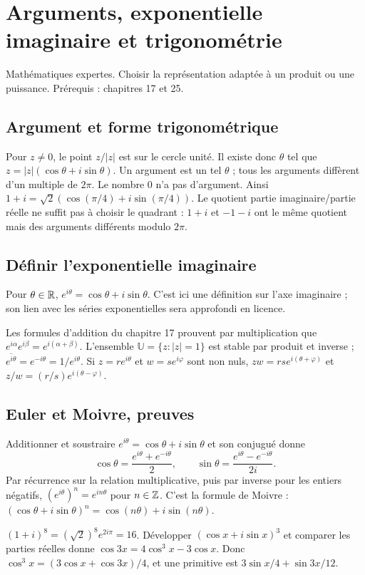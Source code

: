 \documentclass[../cours_tle.tex]{subfiles}
\begin{document}
\setcounter{chapter}{25}
\chapter{Arguments, exponentielle imaginaire et trigonométrie}
\label{ch:26}
\begin{objectif}
Mathématiques expertes. Choisir la représentation adaptée à un produit ou une puissance. Prérequis : chapitres 17 et 25.
\end{objectif}
\section{Argument et forme trigonométrique}
Pour $z\ne0$, le point $z/|z|$ est sur le cercle unité. Il existe donc $\theta$ tel que
$z=|z|(\cos\theta+i\sin\theta)$.
Un argument est un tel $\theta$ ; tous les arguments diffèrent d'un multiple de $2\pi$. Le nombre $0$ n'a pas d'argument.
Ainsi $1+i=\sqrt2(\cos(\pi/4)+i\sin(\pi/4))$.
Le quotient partie imaginaire/partie réelle ne suffit pas à choisir le quadrant : $1+i$ et $-1-i$ ont le même quotient mais des arguments différents modulo $2\pi$.
\section{Définir l'exponentielle imaginaire}
\begin{definition}
Pour $\theta\in\mathbb{R}$, $e^{i\theta}=\cos\theta+i\sin\theta$.
C'est ici une définition sur l'axe imaginaire ; son lien avec les séries exponentielles sera approfondi en licence.
\end{definition}
Les formules d'addition du chapitre 17 prouvent par multiplication que
$e^{i\alpha}e^{i\beta}=e^{i(\alpha+\beta)}$.
L'ensemble $\mathbb U=\{z:|z|=1\}$ est stable par produit et inverse ; $\overline{e^{i\theta}}=e^{-i\theta}=1/e^{i\theta}$.
Si $z=re^{i\theta}$ et $w=se^{i\varphi}$ sont non nuls,
$zw=rse^{i(\theta+\varphi)}$ et $z/w=(r/s)e^{i(\theta-\varphi)}$.
\section{Euler et Moivre, preuves}
Additionner et soustraire $e^{i\theta}=\cos\theta+i\sin\theta$ et son conjugué donne
\[
\cos\theta=\frac{e^{i\theta}+e^{-i\theta}}2,\qquad
\sin\theta=\frac{e^{i\theta}-e^{-i\theta}}{2i}.
\]
Par récurrence sur la relation multiplicative, puis par inverse pour les entiers négatifs,
$(e^{i\theta})^n=e^{in\theta}$ pour $n\in\mathbb{Z}$.
C'est la formule de Moivre : $(\cos\theta+i\sin\theta)^n=\cos(n\theta)+i\sin(n\theta)$.
\begin{exemple}
$(1+i)^8=(\sqrt2)^8 e^{2i\pi}=16$.
Développer $(\cos x+i\sin x)^3$ et comparer les parties réelles donne
$\cos3x=4\cos^3x-3\cos x$.
Donc $\cos^3x=(3\cos x+\cos3x)/4$, et une primitive est
$3\sin x/4+\sin3x/12$.
\end{exemple}
\end{document}
